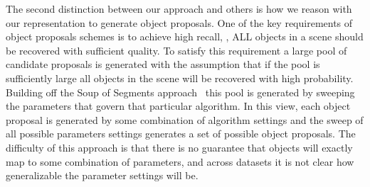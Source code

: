 
 
The second distinction between our approach and others is how we reason with our representation to generate object proposals. One of the key requirements of object proposals schemes is to achieve high recall, \ie, ALL objects in a scene should be recovered with sufficient quality. To satisfy this requirement a large pool of candidate proposals is generated with the assumption that if the pool is sufficiently large all objects in the scene will be recovered with high probability. Building off the Soup of Segments approach~\cite{Malisiewicz:Efros:BMVC07} this pool is generated by sweeping the parameters that govern that particular algorithm. In this view, each object proposal is generated by some combination of algorithm settings and the sweep of all possible parameters settings generates a set of possible object proposals. The difficulty of this approach is that there is no guarantee that objects will exactly map to some combination of parameters, and across datasets it is not clear how generalizable the parameter settings will be. 

